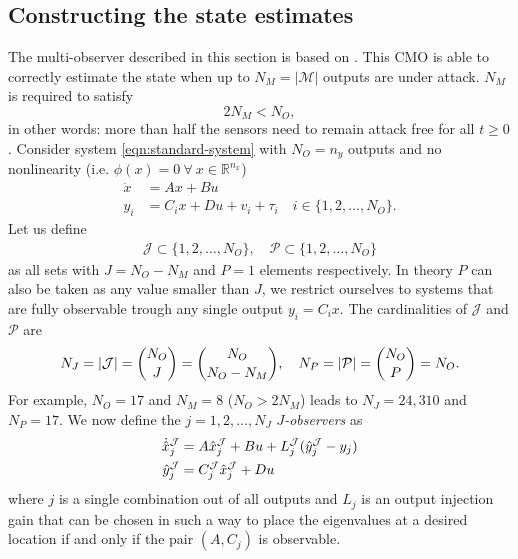\subsection{Constructing the state estimates}
\label{subsec:state-estimates}
The multi-observer described in this section is based on \cite[Section 3B]{Chong2015ObservabilityAttacks}. This CMO is able to correctly estimate the state when up to $N_M = |\mathcal{M}|$ outputs are under attack. $N_M$ is required to satisfy 
\begin{equation}\label{eqn:MO-size-requirement}
    2N_M<N_O,
\end{equation}
in other words: more than half the sensors need to remain attack free for all $t \geq 0$. Consider system \eqref{eqn:standard-system} with $N_O=n_y$ outputs and no nonlinearity (i.e. $\phi(x)=0 \ \forall \ x \in \mathbb{R}^{n_x}$)
\begin{equation*}
    \begin{split}
    \dot{x} &= Ax + Bu \\
        y_i &= C_ix + Du + v_i + \tau_i \quad i  \in \{1,2,\dots,N_O\}.
    \end{split}
\end{equation*}
Let us define 
\begin{equation}\label{eqn:observer-sets}
    \begin{split}
        \mathcal{J} \subset \{1,2,\dots,N_O\}, \quad \mathcal{P} \subset \{1,2,\dots,N_O\}
    \end{split}
\end{equation}
 as all sets with  $J=N_O-N_M$ and  $P=1$ elements respectively. In theory $P$ can also be taken as any value smaller than $J$, we restrict ourselves to systems that are fully observable trough any single output $y_i = C_ix$. The cardinalities of $\mathcal{J}$ and $\mathcal{P}$ are 
\begin{equation}\label{eqn:multi-observer-sizes}
    N_J = |\mathcal{J}|=\binom{N_O}{J}=\binom{N_O}{N_O-N_M}, \quad N_P = |\mathcal{P}| = \binom{N_O}{P} = N_O.
\end{equation}
For example, $N_O=17$ and $N_M=8$ ($N_O>2N_M$) leads to $N_J=24,310$ and $N_P=17$.
We now define the $j=1,2,\dots,N_J$ $J$\textit{-observers} as
\begin{equation*}
    \begin{split}
        \dot{\hat{x}}_j^{\mathcal{J}} &= A\hat{x}_j^{\mathcal{J}} + Bu + L^{\mathcal{J}}_j(\hat{y}_j^{\mathcal{J}} - y_j) \\
        \hat{y}_j^{\mathcal{J}} &= C^{\mathcal{J}}_j\hat{x}_j^{\mathcal{J}} + Du
    \end{split}
\end{equation*}
where $j$ is a single combination out of all outputs and $L_j$ is an output injection gain that can be chosen in such a way to place the eigenvalues at a desired location if and only if the pair $(A,C_j)$ is observable. 

